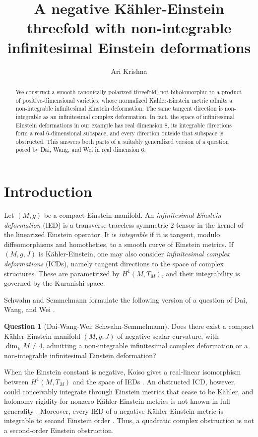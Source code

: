\documentclass[11pt]{amsart}
\title[Non-integrable Einstein deformations]{A negative K\"ahler-Einstein threefold with non-integrable infinitesimal Einstein deformations}
\author[A. Krishna]{Ari Krishna}
\date{}
\numberwithin{equation}{section}
\theoremstyle{plain}
\theoremstyle{definition}
\newtheorem{question}[theorem]{Question}
\newcommand{\R}{\mathbb{R}}
\begin{document}
\begin{abstract}
We construct a smooth canonically polarized threefold, not biholomorphic to a product of positive-dimensional varieties, whose normalized K\"ahler-Einstein metric admits a non-integrable infinitesimal Einstein deformation. The same tangent direction is non-integrable as an infinitesimal complex deformation. In fact, the space of infinitesimal Einstein deformations in our example has real dimension $8$, its integrable directions form a real $6$-dimensional subspace, and every direction outside that subspace is obstructed. This answers both parts of a suitably generalized version of a question posed by Dai, Wang, and Wei in real dimension $6$.
\end{abstract}

\maketitle

\section{Introduction}

Let $(M,g)$ be a compact Einstein manifold. An \emph{infinitesimal Einstein deformation} (IED) is a transverse-traceless symmetric $2$-tensor in the kernel of the linearized Einstein operator. It is \emph{integrable} if it is tangent, modulo diffeomorphisms and homotheties, to a smooth curve of Einstein metrics. If $(M,g,J)$ is K\"ahler-Einstein, one may also consider \emph{infinitesimal complex deformations} (ICDs), namely tangent directions to the space of complex structures. These are parametrized by $H^1(M,T_M)$, and their integrability is governed by the Kuranishi space.

Schwahn and Semmelmann \cite[\S6.3]{SchwahnSemmelmann} formulate the following version of a question of Dai, Wang, and Wei \cite{DaiWangWei}.

\begin{question}[Dai-Wang-Wei; Schwahn-Semmelmann]\label{q:DWW}
Does there exist a compact K\"ahler-Einstein manifold $(M,g,J)$ of negative scalar curvature, with $\dim_{\R}M\neq4$, admitting a non-integrable infinitesimal complex deformation or a non-integrable infinitesimal Einstein deformation?
\end{question}

When the Einstein constant is negative, Koiso gives a real-linear isomorphism between $H^1(M,T_M)$ and the space of IEDs \cite{Koiso}. An obstructed ICD, however, could conceivably integrate through Einstein metrics that cease to be K\"ahler, and holonomy rigidity for nonzero K\"ahler-Einstein metrics is not known in full generality \cite[\S6.3]{SchwahnSemmelmann}. Moreover, every IED of a negative K\"ahler-Einstein metric is integrable to second Einstein order \cite[Thm.~5.3]{NagySemmelmann}. Thus, a quadratic complex obstruction is not a second-order Einstein obstruction.
\end{document}

